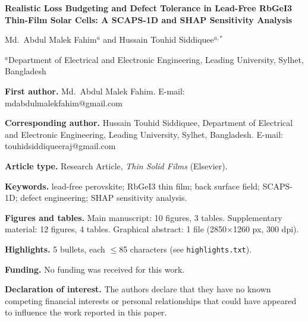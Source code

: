 \documentclass[12pt]{article}
\begin{document}
\begin{center}
{\large\bfseries Realistic Loss Budgeting and Defect Tolerance in Lead-Free RbGeI3 Thin-Film Solar Cells: A SCAPS-1D and SHAP Sensitivity Analysis\par}
\vspace{1.2em}
Md.\ Abdul Malek Fahim$^{a}$ and Hussain Touhid Siddiquee$^{a,*}$\par
\vspace{0.6em}
$^{a}$Department of Electrical and Electronic Engineering, Leading University, Sylhet, Bangladesh\par
\end{center}
\vspace{1em}
\noindent\textbf{First author.} Md.\ Abdul Malek Fahim. E-mail: mdabdulmalekfahim@gmail.com
\vspace{1em}

\noindent\textbf{Corresponding author.} Hussain Touhid Siddiquee, Department of Electrical and Electronic Engineering, Leading University, Sylhet, Bangladesh. E-mail: touhidsiddiqueeraj@gmail.com
\vspace{1em}

\noindent\textbf{Article type.} Research Article, \textit{Thin Solid Films} (Elsevier).
\vspace{1em}

\noindent\textbf{Keywords.} lead-free perovskite; RbGeI3 thin film; back surface field; SCAPS-1D; defect engineering; SHAP sensitivity analysis.
\vspace{1em}

\noindent\textbf{Figures and tables.} Main manuscript: 10 figures, 3 tables. Supplementary material: 12 figures, 4 tables. Graphical abstract: 1 file (2850$\times$1260 px, 300 dpi).
\vspace{1em}

\noindent\textbf{Highlights.} 5 bullets, each $\le$85 characters (see \texttt{highlights.txt}).
\vspace{1em}

\noindent\textbf{Funding.} No funding was received for this work.
\vspace{1em}

\noindent\textbf{Declaration of interest.} The authors declare that they have no known competing financial interests or personal relationships that could have appeared to influence the work reported in this paper.
\end{document}
